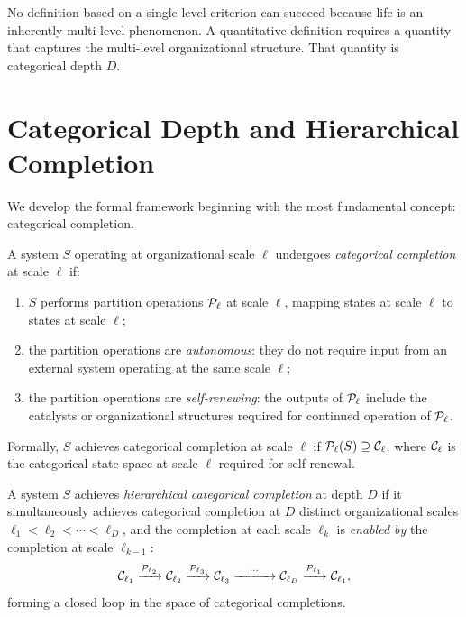 No definition based on a single-level criterion can succeed because life is
an inherently multi-level phenomenon. A quantitative definition requires a
quantity that captures the multi-level organizational structure. That quantity
is categorical depth $D$.

\section{Categorical Depth and Hierarchical Completion}
\label{sec:categorical_depth}

We develop the formal framework beginning with the most fundamental concept:
categorical completion.

\begin{definition}
\label{def:cat_completion}
A system $S$ operating at organizational scale $\ell$ undergoes
\emph{categorical completion} at scale $\ell$ if:
\begin{enumerate}[label=(\roman*)]
  \item $S$ performs partition operations $\mathcal{P}_\ell$ at scale $\ell$, mapping
        states at scale $\ell$ to states at scale $\ell$;
  \item the partition operations are \emph{autonomous}: they do not require
        input from an external system operating at the same scale $\ell$;
  \item the partition operations are \emph{self-renewing}: the outputs of
        $\mathcal{P}_\ell$ include the catalysts or organizational structures required
        for continued operation of $\mathcal{P}_\ell$.
\end{enumerate}
Formally, $S$ achieves categorical completion at scale $\ell$ if
$\mathcal{P}_\ell(S) \supseteq \mathcal{C}_\ell$, where $\mathcal{C}_\ell$ is the categorical
state space at scale $\ell$ required for self-renewal.
\end{definition}

\begin{definition}
\label{def:hierarchical_completion}
A system $S$ achieves \emph{hierarchical categorical completion} at depth $D$
if it simultaneously achieves categorical completion at $D$ distinct
organizational scales $\ell_1 < \ell_2 < \cdots < \ell_D$, and the completion
at each scale $\ell_k$ is \emph{enabled by} the completion at scale $\ell_{k-1}$:
\begin{equation}
  \mathcal{C}_{\ell_1} \xrightarrow{\mathcal{P}_{\ell_2}} \mathcal{C}_{\ell_2}
  \xrightarrow{\mathcal{P}_{\ell_3}} \mathcal{C}_{\ell_3}
  \xrightarrow{\quad\cdots\quad} \mathcal{C}_{\ell_D}
  \xrightarrow{\mathcal{P}_{\ell_1}} \mathcal{C}_{\ell_1},
  \label{eq:hierarchical_loop}
\end{equation}
forming a closed loop in the space of categorical completions.
\end{definition}

